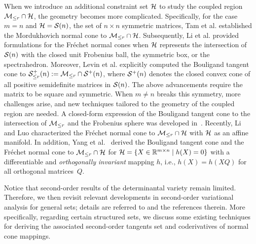 When we introduce an additional constraint set $\mathcal{H}$ to study the coupled region $\mathcal{M}_{\le r}\cap\mathcal{H}$, the geometry becomes more complicated. Specifically, for the case $m=n$ and $\mathcal{H} =\mathcal{S}(n)$, the set of $n\times n$ symmetric matrices, Tam et al. \cite{tam2017sparsesdp} established the Mordukhovich normal cone to $\mathcal{M}_{\le r} \cap \mathcal{H}$. Subsequently, Li et al. \cite{li2020jotaspectral} provided formulations for the Fr\'{e}chet normal cones when $\mathcal{H}$ represents the intersection of $\mathcal{S}(n)$ with the closed unit Frobenius ball, the symmetric box, or the spectrahedron. Moreover, Levin et al. \cite{levin2025effect} explicitly computed the Bouligand tangent cone to $\mathcal{S}^+_{\le r}(n):=\mathcal{M}_{\le r}\cap\mathcal{S}^+(n)$, where $\mathcal{S}^+(n)$ denotes the closed convex cone of all positive semidefinite matrices in $\mathcal{S}(n)$. The above advancements require the matrix to be square and symmetric. When $m\neq n$ breaks this symmetry, more challenges arise, and new techniques tailored to the geometry of the coupled region are needed. A closed-form expression of the Bouligand tangent cone to the intersection of $\mathcal{M}_{\le r}$ and the Frobenius sphere was developed in~\cite{cason2013iterative}. Recently, Li and Luo \cite{li2023normalboundedaffine} characterized the Fr\'{e}chet normal cone to $\mathcal{M}_{\le r}\cap\mathcal{H}$ with $\mathcal{H}$ as an affine manifold. In addition, Yang et al.~\cite{yang2025spacedecouple} derived the Bouligand tangent cone and the Fr\'{e}chet normal cone to $\mathcal{M}_{\le r}\cap\mathcal{H}$ for $\mathcal{H}=\{X\in\mathbb{R}^{m\times n}\mid h(X)=0\}$ with a differentiable and \emph{orthogonally invariant} mapping $h$, i.e., $h(X)=h(XQ)$ for all orthogonal matrices~$Q$.

\bigskip

Notice that second-order results of the determinantal variety remain limited. Therefore, we then revisit relevant developments in second-order variational analysis for general sets; details are referred to \cite{rockafellar2009variationalanalysis,mordukhovich2024secondorder} and the references therein. More specifically, regarding certain structured sets, we discuss some existing techniques for deriving the associated second-order tangents set and coderivatives of normal cone mappings.

